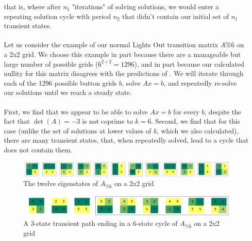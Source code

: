 \documentclass[11pt]{article}
\begin{document}
\noindent that is, where after $n_1$ "iterations" of solving solutions, we would enter a repeating solution cycle with period $n_2$ that didn't contain our initial set of $n_1$ transient states.

\paragraph{} Let us consider the example of our normal Lights Out transition matrix $A \% 6$ on a 2x2 grid. We choose this example in part because there are a manageable but large number of possible grids ($6^{2 \times 2} = 1296$), and in part because our calculated nullity for this matrix disagrees with the predictions of \cite{involve}. We will iterate through each of the 1296 possible button grids $b$, solve $Ax=b$, and repeatedly re-solve our solutions until we reach a steady state.

\paragraph{} First, we find that we appear to be able to solve $Ax=b$ for every $b$, despite the fact that $\det(A) = -3$ is not coprime to $k=6$. Second, we find that for this case (unlike the set of solutions at lower values of $k$, which we also calculated), there are many transient states, that, when repeatedly solved, lead to a cycle that does not contain them.



\begin{figure}
\caption{The twelve eigenstates of $A_{\% 6}$ on a 2x2 grid}
\label{eig622}
\includegraphics[width=\textwidth]{eig622.png}
\end{figure}

\begin{figure}
  \caption{A 3-state transient path ending in a 6-state cycle of $A_{\% 6}$ on a 2x2 grid}
\label{cycle622}
\includegraphics[width=\textwidth]{cycle622.png}
\end{figure}
\end{document}

